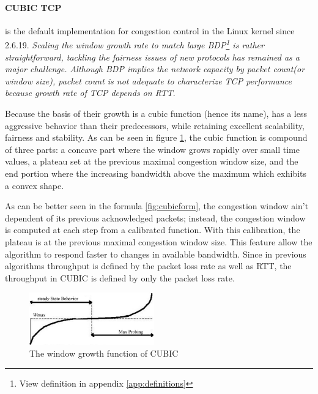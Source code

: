 \paragraph{CUBIC TCP}  is the default implementation for congestion control in
the Linux kernel since 2.6.19. \textit{Scaling the window growth rate to match
large BDP\footnote{View definition in appendix \ref{app:definitions}} is rather
straightforward, tackling the fairness issues of new protocols has remained as
a major challenge.  Although BDP implies the network capacity by packet
count(or window size), packet count is not adequate to characterize TCP
performance because growth rate of TCP depends on RTT}\cite{HaCubic}.

Because the basis of their growth is a cubic function (hence its name), has a
less aggressive behavior than their predecessors, while retaining excellent
scalability, fairness and stability. As can be seen in figure
\ref{fig:cubicfunc}, the cubic function is compound of three parts: a concave
part where the window grows rapidly over small time values, a plateau set at the previous maximal
congestion window size, and the end portion where the increasing bandwidth
above the maximum which exhibits a convex shape.

As can be better seen in the formula \ref{fig:cubicform}, the congestion
window ain't dependent of its previous acknowledged packets; instead, the
congestion window is computed at each step from a calibrated function. With
this calibration, the plateau is at the previous maximal congestion window
size. This feature allow the algorithm to respond faster to changes in
available bandwidth. Since in previous algorithms throughput is defined by the
packet loss rate as well as RTT, the throughput in CUBIC is defined by only
the packet loss rate.

\begin{figure}
\begin{center}
    \includegraphics[width=0.48\textwidth]{img/cubic}
  \end{center}
\caption{The window growth function of CUBIC}
\label{fig:cubicfunc}
\end{figure}

